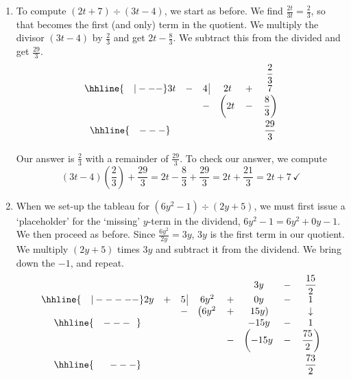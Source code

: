 \begin{exampleSol}
\begin{enumerate}
\item    To compute  $\left(2t +  7\right) \div \left(3t - 4\right)$, we start as before.  We find $\frac{2t}{3t} = \frac{2}{3}$, so that becomes the first (and only) term in the quotient.  We multiply the divisor $(3t-4)$ by $\frac{2}{3}$ and get $2t - \frac{8}{3}$.  We subtract this from the divided and get $\frac{29}{3}$.\setlength\arraycolsep{0.1pt}\setlength\extrarowheight{5pt}\[ \begin{array}{cccccc}
& & & & & \dfrac{2}{3} \\ \hhline{~~~|---}
3t & - & 4 \, \vline& 2t & + & 7  \\
 &  &  -& \left(2t\vphantom{\dfrac{8}{3}} \right. & - & \left.  \dfrac{8}{3}\right)  \\ \hhline{~~~---}
 &  &  &   &  & \dfrac{29}{3} \vphantom{\sqrt{\dfrac{7}{7}}} \\ 
\end{array}\]
\setlength\arraycolsep{5pt}
\setlength\extrarowheight{0pt}

Our answer is $\frac{2}{3}$ with a remainder of $\frac{29}{3}$.  To check our answer, we compute \[(3t-4) \left(\frac{2}{3}\right) + \frac{29}{3} = 2t - \frac{8}{3} + \frac{29}{3} = 2t + \frac{21}{3} = 2t + 7 \, \checkmark\]

\item When we set-up the tableau for   $\left(6y^2 - 1 \right) \div \left(2y + 5\right)$, we must first issue a `placeholder' for the `missing' $y$-term in the dividend, $6y^2 -1 = 6y^2 + 0y - 1$.  We then proceed as before.  Since $\frac{6y^2}{2y} = 3y$, $3y$ is the first term in our quotient. We multiply $(2y+5)$ times $3y$ and subtract it from the dividend.  We bring down the $-1$, and repeat.  \setlength\arraycolsep{0.1pt}\setlength\extrarowheight{5pt}\[ \begin{array}{cccccccc}
& & & & & 3y & - & \dfrac{15}{2}  \\ \hhline{~~~|-----}
2y& + & 5 \, \vline& 6y^2 & + & 0y & - & 1  \\
 &  &  -& \left(6y^2 \right. & + & \left.  15y\right) &  & \downarrow  \\ \hhline{~~~---~~} 
 &  &  &   &  & -15y & - & 1  \\ 
 &  &  &   & - & \left(-15y\vphantom{\dfrac{75}{2}} \right. & - & \left. \dfrac{75}{2} \right) \\ \hhline{~~~~~---} 
 &  &  &   &   &  & & \dfrac{73}{2} \vphantom{\sqrt{\dfrac{73}{2}}}\\
\end{array}\]
\setlength\arraycolsep{5pt}
\setlength\extrarowheight{0pt}
 

\end{enumerate}
\end{exampleSol}
